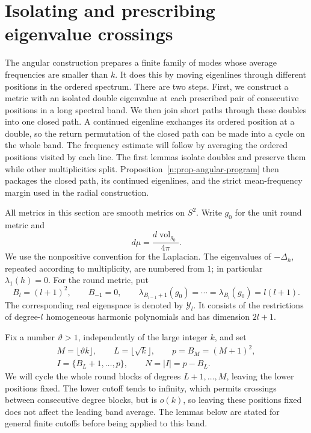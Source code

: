 \section{Isolating and prescribing eigenvalue crossings}\label{n:sec-angular}

The angular construction prepares a finite family of modes whose average
frequencies are smaller than \(k\).  It does this by moving eigenlines
through different positions in the ordered spectrum.  There are two steps.
First, we construct a metric with an isolated double eigenvalue at each
prescribed pair of consecutive positions in a long spectral band.  We then
join short paths through these doubles into one closed path.  A continued
eigenline exchanges its ordered position at a double, so the return
permutation of the closed path can be made into a cycle on the whole band.
The frequency estimate will follow by averaging the ordered positions
visited by each line.
The first lemmas isolate doubles and preserve them while other
multiplicities split. Proposition~\ref{n:prop-angular-program} then
packages the closed path, its continued eigenlines, and the strict
mean-frequency margin used in the radial construction.

All metrics in this section are smooth metrics on \(S^2\).  Write \(g_0\)
for the unit round metric and
\[
 d\mu=\frac{d\operatorname{vol}_{g_0}}{4\pi}.
\]
We use the nonpositive convention for the Laplacian.  The eigenvalues of
\(-\Delta_h\), repeated according to multiplicity, are numbered from \(1\);
in particular \(\lambda_1(h)=0\).  For the round metric, put
\begin{equation}\label{n:eq-round-blocks}
 B_l=(l+1)^2,\qquad B_{-1}=0,\qquad
 \lambda_{B_{l-1}+1}(g_0)=\cdots=\lambda_{B_l}(g_0)=l(l+1).
\end{equation}
The corresponding real eigenspace is denoted by \(\mathcal Y_l\).  It
consists of the restrictions of degree-\(l\) homogeneous harmonic
polynomials and has dimension \(2l+1\).

Fix a number \(\vartheta>1\), independently of the large integer \(k\),
and set
\begin{equation}\label{n:eq-band}
 \begin{gathered}
 M=\lfloor\vartheta k\rfloor,\qquad L=\lfloor\sqrt{k}\rfloor,
 \qquad p=B_M=(M+1)^2,\\
 I=\{B_L+1,\ldots,p\},\qquad N=|I|=p-B_L.
 \end{gathered}
\end{equation}
We will cycle the whole round blocks of degrees \(L+1,\ldots,M\),
leaving the lower positions fixed.  The lower cutoff tends to infinity,
which permits crossings between consecutive degree blocks, but is
\(o(k)\), so leaving these positions fixed does not affect the leading band
average.  The lemmas below are stated for general finite cutoffs before
being applied to this band.

